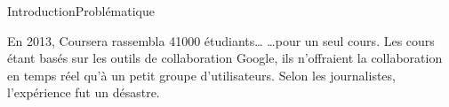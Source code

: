 \begin{frame}{Introduction}{Problématique}
\begin{minipage}{0.32\textwidth}
\begin{center}
\begin{tikzpicture}
      \end{tikzpicture}
    \end{center}
  \end{minipage}
  \begin{minipage}{0.32\textwidth}
    \begin{center}
    \end{center}
  \end{minipage}


  \begin{exampleblock}{En 2013, Coursera rassembla 41000 étudiants\ldots}
    \ldots pour un seul cours.  Les cours étant basés sur les outils de
    collaboration Google, ils n'offraient la collaboration en temps réel qu'à un
    petit groupe d'utilisateurs. Selon les journalistes, l'expérience fut un \og
    désastre\fg {}.
  \end{exampleblock}

  \vspace{0.05cm}
\end{frame}


